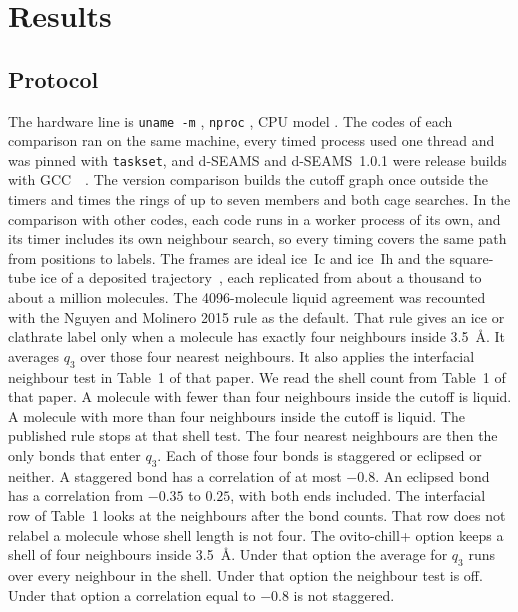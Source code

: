 \documentclass[preprint,12pt]{elsarticle}
\begin{document}
\section{Results}
\label{sec:results}

\subsection{Protocol}
\label{sec:protocol}

The hardware line is \texttt{uname -m} \texttt{}, \texttt{nproc} , CPU model \texttt{}.
The codes of each comparison ran on the same machine, every timed process used one thread and was pinned with \texttt{taskset}, and d-SEAMS and d-SEAMS~1.0.1 were release builds with GCC~~\cite{dseams101}.
The version comparison builds the cutoff graph once outside the timers and times the rings of up to seven members and both cage searches.
In the comparison with other codes, each code runs in a worker process of its own, and its timer includes its own neighbour search, so every timing covers the same path from positions to labels.
The frames are ideal ice~Ic and ice~Ih and the square-tube ice of a deposited trajectory~\cite{goswami2019nanotubedata}, each replicated from about a thousand to about a million molecules.
The 4096-molecule liquid agreement was recounted with the Nguyen and
Molinero 2015 rule as the default.
That rule gives an ice or clathrate label only when a molecule has
exactly four neighbours inside 3.5~\AA.
It averages $q_3$ over those four nearest neighbours.
It also applies the interfacial neighbour test in Table~1 of that paper.
We read the shell count from Table~1 of that paper.
A molecule with fewer than four neighbours inside the cutoff is liquid.
A molecule with more than four neighbours inside the cutoff is liquid.
The published rule stops at that shell test.
The four nearest neighbours are then the only bonds that enter $q_3$.
Each of those four bonds is staggered or eclipsed or neither.
A staggered bond has a correlation of at most $-0.8$.
An eclipsed bond has a correlation from $-0.35$ to $0.25$, with both
ends included.
The interfacial row of Table~1 looks at the neighbours after the bond
counts.
That row does not relabel a molecule whose shell length is not four.
The ovito-chill+ option keeps a shell of four neighbours inside 3.5~\AA.
Under that option the average for $q_3$ runs over every neighbour in the
shell.
Under that option the neighbour test is off.
Under that option a correlation equal to $-0.8$ is not staggered.
\end{document}
